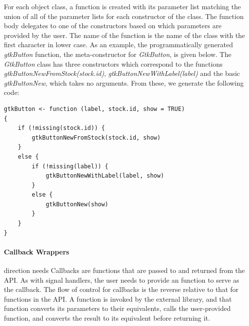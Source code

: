 \documentclass[article]{jss}
\begin{document}
For each object class, a function is created with its parameter list
matching 
the union of all of the parameter lists for each constructor of the
class.
The function body delegates to one of the constructors based on which
parameters are provided by the user. The name of the function is the
name
of the class with the first character in lower case. As an example,
the 
programmatically generated \emph{gtkButton} function, the
meta-constructor for \emph{GtkButton},
is given below.  The \emph{GtkButton} class has three constructors which correspond to the functions \emph{gtkButtonNewFromStock(stock.id)}, \emph{gtkButtonNewWithLabel(label)} and the basic \emph{gtkButtonNew}, which takes no arguments. From these, we generate the following code:
\begin{verbatim}
gtkButton <- function (label, stock.id, show = TRUE) 
{
    if (!missing(stock.id)) {
        gtkButtonNewFromStock(stock.id, show)
    }
    else {
        if (!missing(label)) {
            gtkButtonNewWithLabel(label, show)
        }
        else {
            gtkButtonNew(show)
        }
    }
}
\end{verbatim}

\paragraph{Callback Wrappers}
direction needs
%
Callbacks are functions that are passed to and returned from the API. As with signal handlers, the user needs to provide an  function to serve as the callback. The flow of control for callbacks is the reverse relative to that for functions in the API. A  function is invoked by the external library, and that function converts its parameters to their  equivalents, calls the user-provided  function, and converts the result to its  equivalent before returning it.
\end{document}
